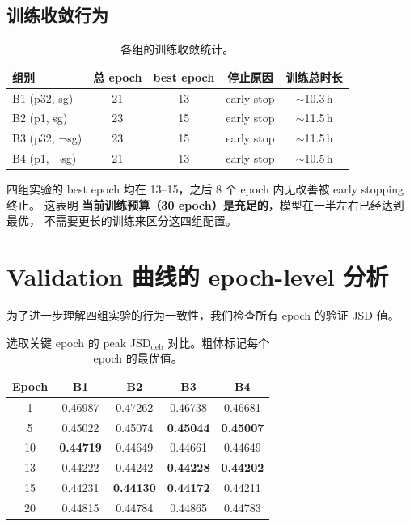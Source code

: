 \documentclass[11pt,a4paper]{ctexart}
\begin{document}
\subsection{训练收敛行为}

\begin{table}[H]
\centering
\small
\caption{各组的训练收敛统计。}
\label{tab:convergence}
\begin{tabular}{l c c c c}
\toprule
组别 & 总 epoch & best epoch & 停止原因 & 训练总时长 \\
\midrule
B1 (p32, sg)   & 21 & 13 & early stop & $\sim$10.3\,h \\
B2 (p1, sg)    & 23 & 15 & early stop & $\sim$11.5\,h \\
B3 (p32, ¬sg)  & 23 & 15 & early stop & $\sim$11.5\,h \\
B4 (p1, ¬sg)   & 21 & 13 & early stop & $\sim$10.5\,h \\
\bottomrule
\end{tabular}
\end{table}

四组实验的 best epoch 均在 13--15，之后 8 个 epoch 内无改善被 early stopping 终止。
这表明 \textbf{当前训练预算（30 epoch）是充足的}，模型在一半左右已经达到最优，
不需要更长的训练来区分这四组配置。

\section{Validation 曲线的 epoch-level 分析}

为了进一步理解四组实验的行为一致性，我们检查所有 epoch 的验证 JSD 值。

\begin{table}[H]
\centering
\small
\caption{选取关键 epoch 的 peak JSD$_\text{deb}$ 对比。粗体标记每个 epoch 的最优值。}
\label{tab:epoch_comparison}
\begin{tabular}{c c c c c}
\toprule
Epoch & B1 & B2 & B3 & B4 \\
\midrule
1  & 0.46987 & 0.47262 & 0.46738 & 0.46681 \\
5  & 0.45022 & 0.45074 & \textbf{0.45044} & \textbf{0.45007} \\
10 & \textbf{0.44719} & 0.44649 & 0.44661 & 0.44649 \\
13 & 0.44222 & 0.44242 & \textbf{0.44228} & \textbf{0.44202} \\
15 & 0.44231 & \textbf{0.44130} & \textbf{0.44172} & 0.44211 \\
20 & 0.44815 & 0.44784 & 0.44865 & 0.44783 \\
\bottomrule
\end{tabular}
\end{table}
\end{document}
